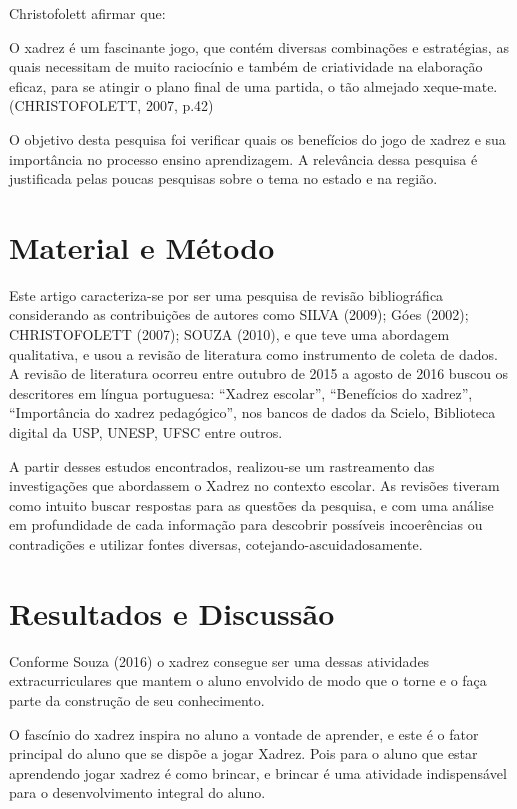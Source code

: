 \documentclass[article,12pt,onesidea,4paper,english,brazil]{abntex2}
\begin{document}
	Christofolett afirmar que:
	
	\begin{citacao}
		O xadrez é um fascinante jogo, que contém diversas combinações e estratégias, as quais necessitam de muito raciocínio e também de criatividade na elaboração eficaz, para se atingir o plano final de uma partida, o tão almejado xeque-mate. (CHRISTOFOLETT, 2007, p.42)
	\end{citacao}
	
	O objetivo desta pesquisa foi verificar quais os benefícios do jogo de xadrez e sua importância no processo ensino aprendizagem. A relevância dessa pesquisa é justificada pelas poucas pesquisas sobre o tema no estado e na região.
	
	\section*{Material e Método}
	
	Este artigo caracteriza-se por ser uma pesquisa de revisão bibliográfica considerando as contribuições de autores como SILVA (2009); Góes (2002); CHRISTOFOLETT (2007); SOUZA (2010), e que teve uma abordagem qualitativa, e usou a revisão de literatura como instrumento de coleta de dados. A revisão de literatura ocorreu entre outubro de 2015 a agosto de 2016 buscou os descritores em língua portuguesa: “Xadrez escolar”, “Benefícios do xadrez”, “Importância do xadrez pedagógico”, nos bancos de dados da Scielo, Biblioteca digital da USP, UNESP, UFSC entre outros.
	
	A partir desses estudos encontrados, realizou-se um rastreamento das investigações que abordassem o Xadrez no contexto escolar. As revisões tiveram como intuito buscar respostas para as questões da pesquisa, e com uma análise em profundidade de cada informação para descobrir possíveis incoerências ou contradições e utilizar fontes diversas, cotejando-ascuidadosamente.
	
	
	\section*{Resultados e Discussão}
	
	Conforme Souza (2016) o xadrez consegue ser uma dessas atividades extracurriculares que mantem o aluno envolvido de modo que o torne e o faça parte da construção de seu conhecimento.
	
	O fascínio do xadrez inspira no aluno a vontade de aprender, e este é o fator principal do aluno que se dispõe a jogar Xadrez. Pois para o aluno que estar aprendendo jogar xadrez é como brincar, e brincar é uma atividade indispensável para o desenvolvimento integral do aluno.
	
\end{document}
